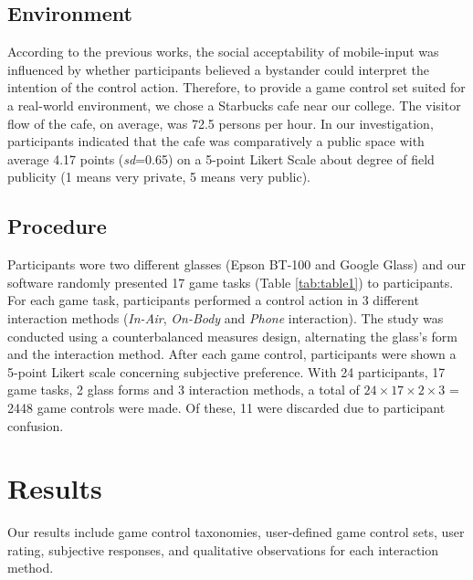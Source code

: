 \documentclass{sigchi}
\begin{document}
  \subsection {Environment}
  According to the previous works\cite{Wiliamson:2011:MMI:2070481.2070551,Williamson:2013:MEM:2522848.2522874,Montero:2010:YUS:1851600.1851647,Rico:2010:UGM:1753326.1753458}, the social acceptability of mobile-input was influenced by whether participants believed a bystander could interpret the intention of the control action. Therefore, to provide a game control set suited for a real-world environment, we chose a Starbucks cafe near our college. The visitor flow of the cafe, on average, was 72.5 persons per hour. In our investigation, participants indicated that the cafe was comparatively a public space with average 4.17 points (\textsl{sd}=0.65) on a 5-point Likert Scale about degree of field publicity (1 means very private, 5 means very public).    

  

    \subsection {Procedure}
    Participants wore two different glasses (Epson BT-100 and Google Glass) and our software randomly presented 17 game tasks (Table \ref{tab:table1}) to participants. For each game task, participants performed a control action in 3 different interaction methods (\emph{In-Air}, \emph{On-Body} and \emph{Phone} interaction). The study was conducted using a counterbalanced measures design, alternating the glass's form and the interaction method. After each game control, participants were shown a 5-point Likert scale concerning subjective preference. With 24 participants, 17 game tasks, 2 glass forms and 3 interaction methods, a total of $24 \times 17 \times 2 \times 3$ = 2448 game controls were made. Of these, 11 were discarded due to participant confusion. 

\section{Results}

Our results include game control taxonomies, user-defined game control sets, user rating, subjective responses, and qualitative observations for each interaction method.
\end{document}
